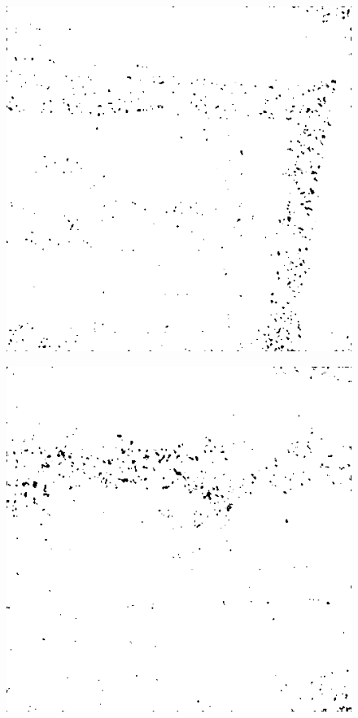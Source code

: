\begin{figure}[H]
\begin{minipage}[t]{0.245\textwidth}
    \subcaption{}
    \label{fig:bad2}
\end{minipage}
\begin{minipage}[t]{0.245\textwidth}
    \includegraphics[width=1\textwidth]{result/SPC_NRQA/b75_512_m30.PNG}
    \subcaption{}
    \label{fig:bad3}
\end{minipage}
\begin{minipage}[t]{0.245\textwidth}
    \includegraphics[width = \textwidth]{result/SPC_NRQA/b79_512_m30.PNG}

\end{minipage}
\end{figure}
